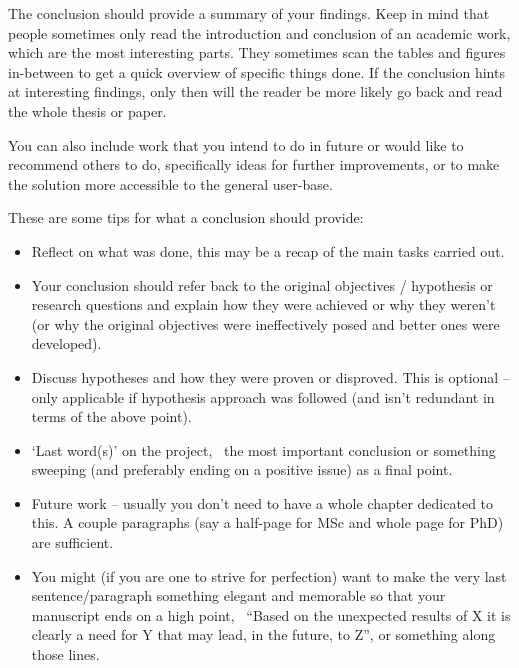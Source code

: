 \label{Ch:Conclusion}

The conclusion should provide a summary of your findings.  Keep in mind that people sometimes only read the introduction and conclusion of an academic work, which are the most interesting parts.  They sometimes scan the tables and figures in-between to get a quick overview of specific things done.  If the conclusion hints at interesting findings, only then will the reader be more likely go back and read the whole thesis or paper.

You can also include work that you intend to do in future or would like to recommend others to do, specifically ideas for further improvements, or to make the solution more accessible to the general user-base.

These are some tips for what a conclusion should provide:

\begin{itemize}
  \item Reflect on what was done, this may be a recap of the main tasks carried out.

  \item Your conclusion should refer back to the original objectives / hypothesis or research questions and explain how they were achieved or why they weren't (or why the original objectives were ineffectively posed and better ones were developed).

  \item Discuss hypotheses and how they were proven or disproved.  This is optional -- only applicable if hypothesis approach was followed (and isn't redundant in terms of the above point).

  \item `Last word(s)' on the project, \eg~the most important conclusion or something sweeping (and preferably ending on a positive issue) as a final point.

  \item Future work -- usually you don't need to have a whole chapter dedicated to this.  A couple paragraphs (say a half-page for MSc and whole page for PhD) are sufficient.

  \item You might (if you are one to strive for perfection) want to make the very last sentence/paragraph something elegant and memorable so that your manuscript ends on a high point, \eg~``Based on the unexpected results of X it is clearly a need for Y that may lead, in the future, to Z'', or something along those lines.
\end{itemize}
